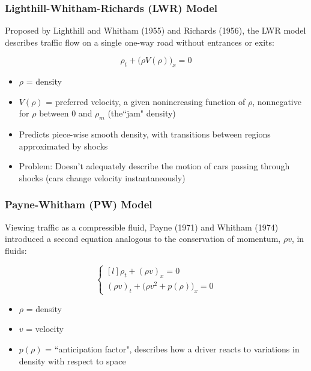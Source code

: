 \documentclass{beamer}
\begin{document}

\begin{frame}
\frametitle{Lighthill-Whitham-Richards (LWR) Model}

Proposed by Lighthill and Whitham (1955) and Richards (1956), the LWR model describes traffic flow on a single one-way road without entrances or exits:

\[ \rho_t + \Big(\rho V(\rho)\Big)_x = 0 \]

\begin{itemize}
\item $\rho$ = density
\item $V(\rho)$  = preferred velocity, a given nonincreasing function of $\rho$, nonnegative for $\rho$ between 0 and $\rho_m$ (the``jam" density)
\item Predicts piece-wise smooth density, with transitions between regions approximated by shocks
\item Problem: Doesn't adequately describe the motion of cars passing through shocks (cars change velocity instantaneously) 
\end{itemize}

\end{frame}


\begin{frame}
\frametitle{Payne-Whitham (PW) Model}

Viewing traffic as a compressible fluid, Payne (1971) and Whitham (1974) introduced a second equation analogous to the conservation of momentum, $\rho v$, in fluids:

\[ \left\{ \begin{matrix*}[l] \rho_t + (\rho v)_x = 0 \\[2ex] (\rho v)_t + \Big(\rho v^2 + p(\rho)\Big)_x = 0 \end{matrix*} \right. \]

\begin{itemize}
\item $\rho$ = density
\item $v$ = velocity
\item $p(\rho)$ = ``anticipation factor", describes how a driver reacts to variations in density with respect to space
\end{itemize}

\end{frame}
\end{document}
